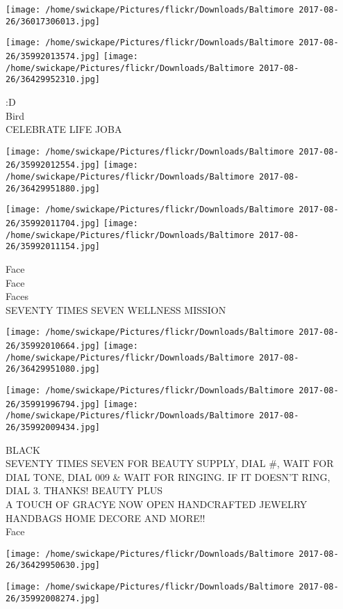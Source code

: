 \documentclass[10pt,letterpaper]{article}
\begin{document}
\texttt{[image: /home/swickape/Pictures/flickr/Downloads/Baltimore 2017-08-26/36017306013.jpg]}

\vspace{0.25in}
\texttt{[image: /home/swickape/Pictures/flickr/Downloads/Baltimore 2017-08-26/35992013574.jpg]}
\texttt{[image: /home/swickape/Pictures/flickr/Downloads/Baltimore 2017-08-26/36429952310.jpg]}

:D\\
Bird\\
CELEBRATE LIFE JOBA
\pagebreak

\texttt{[image: /home/swickape/Pictures/flickr/Downloads/Baltimore 2017-08-26/35992012554.jpg]}
\texttt{[image: /home/swickape/Pictures/flickr/Downloads/Baltimore 2017-08-26/36429951880.jpg]}

\texttt{[image: /home/swickape/Pictures/flickr/Downloads/Baltimore 2017-08-26/35992011704.jpg]}
\texttt{[image: /home/swickape/Pictures/flickr/Downloads/Baltimore 2017-08-26/35992011154.jpg]}

Face\\
Face\\
Faces\\
SEVENTY TIMES SEVEN WELLNESS MISSION
\pagebreak

\texttt{[image: /home/swickape/Pictures/flickr/Downloads/Baltimore 2017-08-26/35992010664.jpg]}
\texttt{[image: /home/swickape/Pictures/flickr/Downloads/Baltimore 2017-08-26/36429951080.jpg]}

\texttt{[image: /home/swickape/Pictures/flickr/Downloads/Baltimore 2017-08-26/35991996794.jpg]}
\texttt{[image: /home/swickape/Pictures/flickr/Downloads/Baltimore 2017-08-26/35992009434.jpg]}

BLACK\\
SEVENTY TIMES SEVEN FOR BEAUTY SUPPLY, DIAL \#, WAIT FOR DIAL TONE, DIAL 009 \& WAIT FOR RINGING.  IF IT DOESN'T RING, DIAL 3.  THANKS!  BEAUTY PLUS\\
A TOUCH OF GRACYE NOW OPEN HANDCRAFTED JEWELRY HANDBAGS HOME DECORE AND MORE!!\\
Face
\pagebreak

\texttt{[image: /home/swickape/Pictures/flickr/Downloads/Baltimore 2017-08-26/36429950630.jpg]}

\vspace{0.25in}
\texttt{[image: /home/swickape/Pictures/flickr/Downloads/Baltimore 2017-08-26/35992008274.jpg]}
\end{document}
